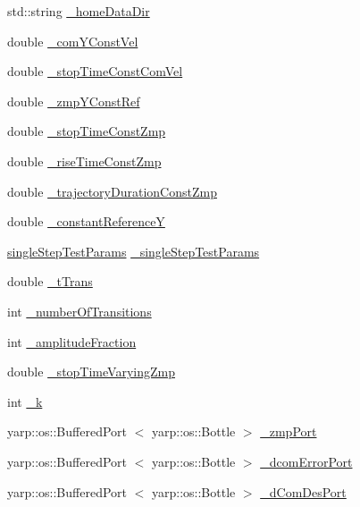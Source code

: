 \begin{DoxyCompactItemize}
\item 
std\-::string \hyperlink{classWalkingClient_ade3bf018661152fc0404d3973ea30783}{\-\_\-home\-Data\-Dir}
\item 
double \hyperlink{classWalkingClient_a4e448bc147b41d97e0f17af6ebb0020f}{\-\_\-com\-Y\-Const\-Vel}
\item 
double \hyperlink{classWalkingClient_a9f19b1a1184cbdbf883cc374c6b6b88f}{\-\_\-stop\-Time\-Const\-Com\-Vel}
\item 
double \hyperlink{classWalkingClient_a6cba3194816a0be78a8b17d539806115}{\-\_\-zmp\-Y\-Const\-Ref}
\item 
double \hyperlink{classWalkingClient_a58b08317f6d8b825a21e1db8c7f0ff32}{\-\_\-stop\-Time\-Const\-Zmp}
\item 
double \hyperlink{classWalkingClient_aab1bac82d66908def9a36bede6bb24e2}{\-\_\-rise\-Time\-Const\-Zmp}
\item 
double \hyperlink{classWalkingClient_aa6b3bf5c2ed923a7a33a9ed461713d98}{\-\_\-trajectory\-Duration\-Const\-Zmp}
\item 
double \hyperlink{classWalkingClient_a7d15e2b9c9ada337280c46d6aadb54f8}{\-\_\-constant\-Reference\-Y}
\item 
\hyperlink{structsingleStepTestParams}{single\-Step\-Test\-Params} \hyperlink{classWalkingClient_a92adc07ae5221e5dde31483fe5d2deae}{\-\_\-single\-Step\-Test\-Params}
\item 
double \hyperlink{classWalkingClient_a144518766ec4eb9eeab230fcb291e20c}{\-\_\-t\-Trans}
\item 
int \hyperlink{classWalkingClient_aefb4ed994a32879a526f2bc8c962927f}{\-\_\-number\-Of\-Transitions}
\item 
int \hyperlink{classWalkingClient_ac548ce03ea9ceffb4b42981942f66dd0}{\-\_\-amplitude\-Fraction}
\item 
double \hyperlink{classWalkingClient_a2ed3837afa0c366f1cdef16b2a99b761}{\-\_\-stop\-Time\-Varying\-Zmp}
\item 
int \hyperlink{classWalkingClient_a8156c60725f7bda3de34ef0aae15bd16}{\-\_\-k}
\item 
yarp\-::os\-::\-Buffered\-Port\*
$<$ yarp\-::os\-::\-Bottle $>$ \hyperlink{classWalkingClient_af2e0817fa94ca802775addd22b09bf7a}{\-\_\-zmp\-Port}
\item 
yarp\-::os\-::\-Buffered\-Port\*
$<$ yarp\-::os\-::\-Bottle $>$ \hyperlink{classWalkingClient_a1b01264c9d9d403a68a149d86d1bc53f}{\-\_\-dcom\-Error\-Port}
\item 
yarp\-::os\-::\-Buffered\-Port\*
$<$ yarp\-::os\-::\-Bottle $>$ \hyperlink{classWalkingClient_a17369473b4fe2ff0eaecc7d41a8430c7}{\-\_\-d\-Com\-Des\-Port}

\end{DoxyCompactItemize}
